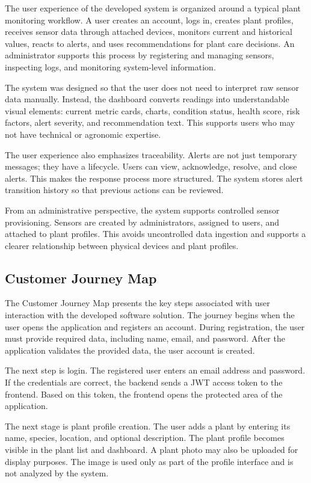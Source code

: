 The user experience of the developed system is organized around a typical plant monitoring workflow. A user creates an account, logs in, creates plant profiles, receives sensor data through attached devices, monitors current and historical values, reacts to alerts, and uses recommendations for plant care decisions. An administrator supports this process by registering and managing sensors, inspecting logs, and monitoring system-level information.

The system was designed so that the user does not need to interpret raw sensor data manually. Instead, the dashboard converts readings into understandable visual elements: current metric cards, charts, condition status, health score, risk factors, alert severity, and recommendation text. This supports users who may not have technical or agronomic expertise.

The user experience also emphasizes traceability. Alerts are not just temporary messages; they have a lifecycle. Users can view, acknowledge, resolve, and close alerts. This makes the response process more structured. The system stores alert transition history so that previous actions can be reviewed.

From an administrative perspective, the system supports controlled sensor provisioning. Sensors are created by administrators, assigned to users, and attached to plant profiles. This avoids uncontrolled data ingestion and supports a clearer relationship between physical devices and plant profiles.

\subsection{Customer Journey Map}
\label{subsec:customer-journey-map}

The Customer Journey Map presents the key steps associated with user interaction with the developed software solution. The journey begins when the user opens the application and registers an account. During registration, the user must provide required data, including name, email, and password. After the application validates the provided data, the user account is created.

The next step is login. The registered user enters an email address and password. If the credentials are correct, the backend sends a JWT access token to the frontend. Based on this token, the frontend opens the protected area of the application.

The next stage is plant profile creation. The user adds a plant by entering its name, species, location, and optional description. The plant profile becomes visible in the plant list and dashboard. A plant photo may also be uploaded for display purposes. The image is used only as part of the profile interface and is not analyzed by the system.

